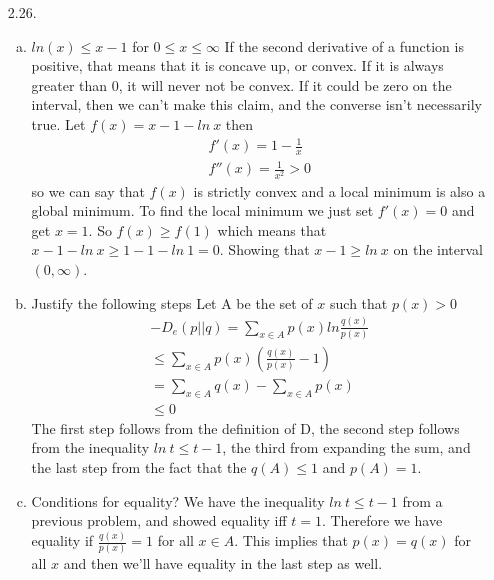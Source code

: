 \documentclass[10pt]{article}
\begin{document}
\begin{itemize}
        \item[2.26.]
        		\begin{enumerate}[a)]
			\item $ln(x) \leq x-1$ for $0\leq x \leq \infty$
				If the second derivative of a function is positive, that means that it is concave up, or convex. If it is always greater than 0, it will never not be convex. If it could be zero on the interval, then we can't make this claim, and the converse isn't necessarily true.
				Let \(f(x)=x-1-ln\ x \) then 
				\begin{eqnarray*}
				 f'(x)= 1-\frac{1}{x}\\
				 f''(x)=\frac{1}{x^2} > 0
				 \end{eqnarray*}
				 so we can say that $f(x)$ is strictly convex and a local minimum is also a global minimum. To find the local minimum we just set $f'(x)=0$ and get $x=1$. So $f(x) \geq f(1)$ which means that $x-1-ln\ x \geq 1-1-ln\ 1 = 0$. Showing that $x-1 \geq ln\ x$ on the interval $(0,\infty)$.
			\item Justify the following steps
				Let A be the set of $x$ such that $p(x) > 0$
				\begin{eqnarray*}
				-D_e(p||q)=\sum_{x\in A} p(x) ln \frac{q(x)}{p(x)}\\
				\leq \sum_{x\in A} p(x)\left( \frac{q(x)}{p(x)}-1\right)\\
				=\sum_{x\in A} q(x) - \sum_{x\in A} p(x)\\
				\leq 0
				\end{eqnarray*}
				The first step follows from the definition of D, the second step follows from the inequality $ln\ t \leq t - 1$, the third from expanding the sum, and the last step from the fact that the $q(A) \leq 1$ and $p(A)=1$.
			\item Conditions for equality?
			We have the inequality $ln\ t \leq t-1$ from a previous problem, and showed equality iff $t=1$. Therefore we have equality if $\frac{q(x)}{p(x)}=1$ for all $x\in A$. This implies that $p(x)=q(x)$ for all $x$ and then we'll have equality in the last step as well. 
			\end{enumerate}	
          

\end{itemize}
\end{document}
